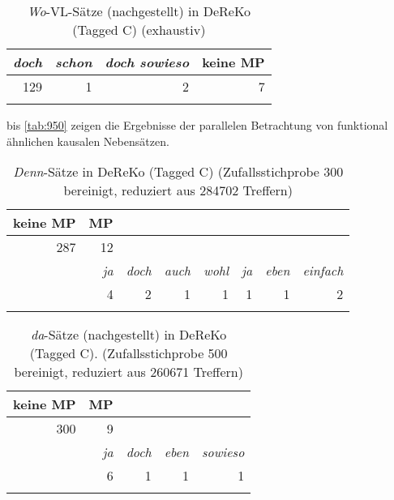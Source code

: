 {\begin{table}
	\caption{\label{tab:947}\textit{Wo}-VL-Sätze (nachgestellt) in DeReKo (Tagged C) (exhaustiv)\protect\footnotemark}
    \begin{tabular}[t]{rrrr}
    \lsptoprule
    \textit{doch} & \textit{schon} & \textit{doch sowieso} & keine MP\\
    \midrule
    129 & 1 & 2 & 7\\
    \lspbottomrule	 
    \end{tabular}   
\end{table}
 bis \ref{tab:950} zeigen die Ergebnisse der parallelen Betrachtung von funktional ähnlichen kausalen Nebensätzen.

\begin{table}
	\caption{\label{tab:948}\textit{Denn}-Sätze in DeReKo (Tagged C) (Zufallsstichprobe 300 bereinigt, reduziert aus 284702 Treffern)}
    \begin{tabular}[t]{rrrrrrrr}
    \lsptoprule
    keine MP & MP & & & & & &  \\
    \midrule
    287 & 12 & & & & & & \\
    & \textit{ja} & \textit{doch} & \textit{auch} & \textit{wohl} & \textit{ja} & \textit{eben} & \textit{einfach}\\
    & 4 & 2 & 1 & 1 & 1 & 1 & 2\\
    \lspbottomrule
    \end{tabular}   
\end{table}

\begin{table}
	\caption{\label{tab:949}\textit{da}-Sätze (nachgestellt) in DeReKo (Tagged C). (Zufallsstichprobe 500 bereinigt, reduziert aus 260671 Treffern)}
    \begin{tabular}[t]{rrrrr}
    \lsptoprule
    keine MP & MP & & & \\
    \midrule
    300 & 9 & & & \\
    & \textit{ja} & \textit{doch} & \textit{eben} & \textit{sowieso}\\
    & 6 & 1 & 1 & 1\\
	\lspbottomrule
    \end{tabular}   
\end{table}

}
